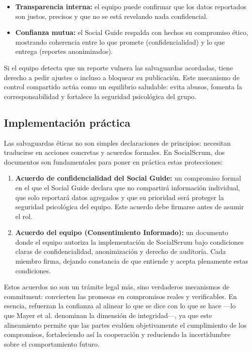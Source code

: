 \begin{itemize}
    \item \textbf{Transparencia interna:} el equipo puede confirmar que los datos reportados son justos, precisos y que no se está revelando nada confidencial.
    \item \textbf{Confianza mutua:} el Social Guide respalda con hechos su compromiso ético, mostrando coherencia entre lo que promete (confidencialidad) y lo que entrega (reportes anonimizados).
\end{itemize}

Si el equipo detecta que un reporte vulnera las salvaguardas acordadas, tiene derecho a pedir ajustes o incluso a bloquear su publicación. Este mecanismo de control compartido actúa como un equilibrio saludable: evita abusos, fomenta la corresponsabilidad y fortalece la seguridad psicológica del grupo.

\subsection{Implementación práctica}

Las salvaguardas éticas no son simples declaraciones de principios: necesitan traducirse en acciones concretas y acuerdos formales. En SocialScrum, dos documentos son fundamentales para poner en práctica estas protecciones:

\begin{enumerate}
    \item \textbf{Acuerdo de confidencialidad del Social Guide:} un compromiso formal en el que el Social Guide declara que no compartirá información individual, que solo reportará datos agregados y que su prioridad será proteger la seguridad psicológica del equipo. Este acuerdo debe firmarse antes de asumir el rol.

    \item \textbf{Acuerdo del equipo (Consentimiento Informado):} un documento donde el equipo autoriza la implementación de SocialScrum bajo condiciones claras de confidencialidad, anonimización y derecho de auditoría. Cada miembro firma, dejando constancia de que entiende y acepta plenamente estas condiciones.

\end{enumerate}

Estos acuerdos no son un trámite legal más, sino verdaderos mecanismos de commitment: convierten las promesas en compromisos reales y verificables. En esencia, refuerzan la confianza al alinear lo que se dice con lo que se hace —lo que Mayer et al. \cite{mayer_integrative_1995} denominan la dimensión de integridad—, ya que este alineamiento permite que las partes evalúen objetivamente el cumplimiento de los compromisos, fortaleciendo así la cooperación y reduciendo la incertidumbre sobre el comportamiento futuro.

